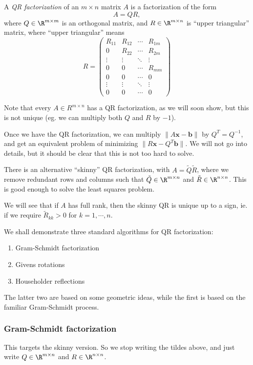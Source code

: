 \documentclass[a4paper]{article}
\begin{document}
\begin{defi}[QR factorization]
  A \emph{QR factorization} of an $m \times n$ matrix $A$ is a factorization of the form
  \[
    A = QR,
  \]
  where $Q \in \R^{m \times m}$ is an orthogonal matrix, and $R \in \R^{m \times n}$ is ``upper triangular'' matrix, where ``upper triangular'' means
  \[
    R =
    \begin{pmatrix}
      R_{11} & R_{12} & \cdots & R_{1m}\\
      0 & R_{22} & \cdots & R_{2m}\\
      \vdots & \vdots & \ddots & \vdots\\
      0 & 0 & \cdots & R_{mm}\\
      0 & 0 & \cdots & 0\\
      \vdots & \vdots & \ddots & \vdots\\
      0 & 0 & \cdots & 0
    \end{pmatrix}
  \]
\end{defi}
Note that every $A \in R^{m \times n}$ has a QR factorization, as we will soon show, but this is not unique (eg. we can multiply both $Q$ and $R$ by $-1$).

Once we have the QR factorization, we can multiply $\|A\mathbf{x} - \mathbf{b}\|$ by $Q^T = Q^{-1}$, and get an equivalent problem of minimizing $\|R \mathbf{x} - Q^T \mathbf{b}\|$. We will not go into details, but it should be clear that this is not too hard to solve.

There is an alternative ``skinny'' QR factorization, with $A = \tilde{Q} \tilde{R}$, where we remove redundant rows and columns such that $\tilde{Q} \in \R^{m \times n}$ and $\tilde{R} \in \R^{n \times n}$. %
This is good enough to solve the least squares problem.

We will see that if $A$ has full rank, then the skinny QR is unique up to a sign, ie. if we require $\tilde{R}_{kk} > 0$ for $k = 1, \cdots, n$.

We shall demonstrate three standard algorithms for QR factorization:
\begin{enumerate}
  \item Gram-Schmidt factorization
  \item Givens rotations
  \item Householder reflections
\end{enumerate}
The latter two are based on some geometric ideas, while the first is based on the familiar Gram-Schmidt process.

\subsubsection*{Gram-Schmidt factorization}
This targets the skinny version. So we stop writing the tildes above, and just write $Q \in \R^{m \times n}$ and $R \in \R^{n \times n}$.
\end{document}
